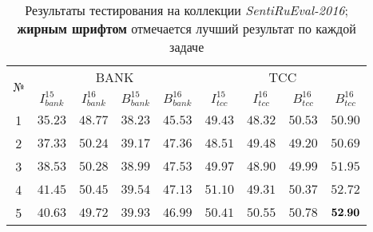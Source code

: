 \begin{table}[ht!]
\centering
\caption{Результаты тестирования на коллекции {\it SentiRuEval-2016};
        {\bf жирным шрифтом} отмечается лучший результат по каждой задаче
        }
\label{table:results2016}
\begin{tabular}{ccccccccc}
\hline
\multicolumn{1}{c|}{\multirow{2}{*}{№}} & \multicolumn{4}{c|}{BANK}                                                                                                                                 & \multicolumn{4}{c}{TCC}                                                                                                          \\ \cline{2-9}
\multicolumn{1}{c|}{}                   & \multicolumn{1}{c|}{$I_{bank}^{15}$} & \multicolumn{1}{c|}{$I_{bank}^{16}$}   & \multicolumn{1}{c|}{$B_{bank}^{15}$} & \multicolumn{1}{c|}{$B_{bank}^{16}$} & \multicolumn{1}{c|}{$I_{tcc}^{15}$} & \multicolumn{1}{c|}{$I_{tcc}^{16}$} & \multicolumn{1}{c|}{$B_{tcc}^{16}$} & $B_{tcc}^{16}$ \\ \hline
1                                       & $35.23$                              & ${48.77}$                              & $38.23$                              & $45.53$                              & $49.43$                             & $48.32$                             & $50.53$                 & $50.90$                    \\
2                                       & $37.33$                              & ${50.24}$                              & $39.17$                              & $47.36$                              & $48.51$                             & $49.48$                             & $49.20$                 & $50.69$                    \\
3                                       & $38.53$                              & ${50.28}$                              & $38.99$                              & $47.53$                              & $49.97$                             & $48.90$                             & $49.99$                 & $51.95$                    \\
4                                       & $41.45$                              & ${50.45}$                              & $39.54$                              & $47.13$                              & $51.10$                             & $49.31$                             & $50.37$                 & $52.72$                    \\
5                                       & $40.63$                              & ${49.72}$                              & $39.93$                              & $46.99$                              & $50.41$                             & $50.55$                             & $50.78$                 & $\bf{52.90}$               \\

\end{tabular}
\end{table}
